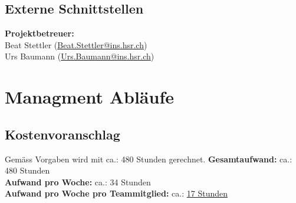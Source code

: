 
\subsection{Externe Schnittstellen}
\textbf{Projektbetreuer:} \\
Beat Stettler (\href{mailto:Beat.Stettler@ins.hsr.ch}{Beat.Stettler@ins.hsr.ch})  
\\
Urs Baumann (\href{mailto:Urs.Baumann@ins.hsr.ch}{Urs.Baumann@ins.hsr.ch})


\section{Managment Abläufe}

\subsection{Kostenvoranschlag}
Gemäss Vorgaben wird mit ca.: 480 Stunden gerechnet.
\newline
\textbf{Gesamtaufwand:} ca.: 480 Stunden\\
\textbf{Aufwand pro Woche:} ca.:  34 Stunden\\
\textbf{Aufwand pro Woche pro Teammitglied:} ca.: \uline{17 Stunden}

